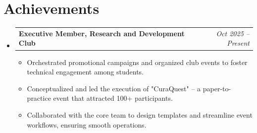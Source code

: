 \documentclass[a4paper,11pt]{article}
\makeatletter
\newcommand{\resumePOR}[3]{
\vspace{0.5mm}\item
    \begin{tabular*}{0.97\textwidth}[t]{l@{\extracolsep{\fill}}r}
        \textbf{#1}\hspace{0.3mm}#2 & \textit{\small{#3}} 
    \end{tabular*}
    \vspace{-2mm}
}
\newcommand{\resumeSubHeadingListStart}{\begin{itemize}[leftmargin=*,labelsep=0mm]}
\newcommand{\resumeItemListStart}{\begin{justify}\begin{itemize}[leftmargin=3ex, rightmargin=2ex, noitemsep,labelsep=1.2mm,itemsep=0mm]\small}
\newcommand{\resumeSubHeadingListEnd}{\end{itemize}\vspace{1mm}}
\newcommand{\resumeItemListEnd}{\end{itemize}\end{justify}\vspace{-6mm}}
\makeatother
\begin{document}
\section{\textbf{Achievements}}
\resumeSubHeadingListStart

\resumePOR{ Executive Member, Research and Development Club}{}{Oct 2025 -- Present}

\resumeItemListStart
    \item {Orchestrated promotional campaigns and organized club events to foster technical engagement among students.}
    \item {Conceptualized and led the execution of "CuraQuest" – a paper-to-practice event that attracted 100+ participants.}
    \item {Collaborated with the core team to design templates and streamline event workflows, ensuring smooth operations.}
\resumeItemListEnd

\resumeSubHeadingListEnd
\vspace{-5mm}
\end{document}
